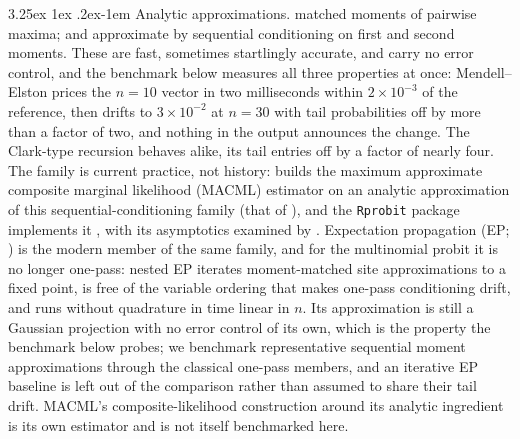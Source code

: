 \documentclass[11pt]{article}
\makeatletter
\renewcommand\paragraph{\@startsection{paragraph}{4}{\z@}%
  {3.25ex \@plus1ex \@minus.2ex}{-1em}%
  {\normalfont\normalsize\itshape}}
\makeatother
\begin{document}
\paragraph{Analytic approximations.} \citet{clark1961} matched moments of
pairwise maxima; \citet{mendell1974} and \citet{solow1990} approximate by
sequential conditioning on first and second moments. These are fast, sometimes
startlingly accurate, and carry no error control, and the benchmark below
measures all three properties at once: Mendell--Elston prices the $n=10$ vector
in two milliseconds within $2\times10^{-3}$ of the reference, then drifts to
$3\times10^{-2}$ at $n=30$ with tail probabilities off by more than a factor
of two, and nothing in the output announces the change. The Clark-type recursion
behaves alike, its tail entries off by a factor of nearly four. The family is current practice, not history:
\citet{bhat2011} builds the maximum approximate composite marginal likelihood (MACML) estimator on an analytic approximation
of this sequential-conditioning family (that of \citealt{solow1990}), and the \texttt{Rprobit} package implements it
\citep{bauerRprobit}, with its asymptotics examined by
\citet{batram2019}. Expectation propagation (EP; \citealt{minka2001})
is the modern member of the same family, and for the multinomial probit
it is no longer one-pass: nested EP \citep{riihimaki2013} iterates
moment-matched site approximations to a fixed point, is free of the
variable ordering that makes one-pass conditioning drift, and runs
without quadrature in time linear in $n$. Its approximation is still a
Gaussian projection with no error control of its own, which is the
property the benchmark below probes; we benchmark representative
sequential moment approximations through the classical one-pass
members, and an iterative EP baseline is left out of the comparison
rather than assumed to share their tail drift. MACML's
composite-likelihood construction around its analytic ingredient is its own
estimator and is not itself benchmarked here.
\end{document}
